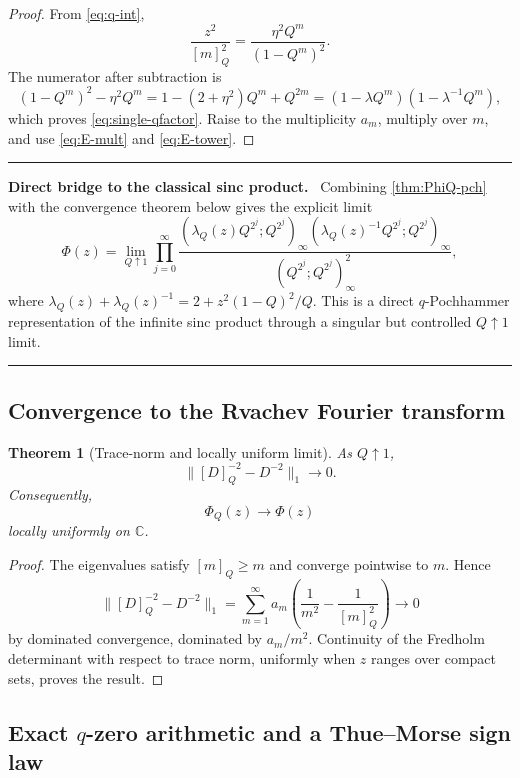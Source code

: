 \documentclass[11pt,oneside]{article}
\numberwithin{equation}{section}
\theoremstyle{plain}
\newtheorem{theorem}{Theorem}[section]
\theoremstyle{definition}
\theoremstyle{remark}
\newcommand{\C}{\mathbb C}
\newenvironment{resultbox}[1]{%
  \par\medskip\noindent\begin{minipage}{\textwidth}%
  \color{DeepGreen}\hrule\vspace{5pt}%
  \color{black}\textbf{\color{DeepGreen}#1.}\ }{%
  \par\vspace{5pt}\color{DeepGreen}\hrule
  \end{minipage}\par\medskip}
\begin{document}
\begin{proof}
From \cref{eq:q-int},
\[
 \frac{z^2}{[m]_Q^2}
 =\frac{\eta^2Q^m}{(1-Q^m)^2}.
\]
The numerator after subtraction is
\[
 (1-Q^m)^2-\eta^2Q^m
 =1-(2+\eta^2)Q^m+Q^{2m}
 =(1-\lambda Q^m)(1-\lambda^{-1}Q^m),
\]
which proves \cref{eq:single-qfactor}.  Raise to the multiplicity $a_m$, multiply over $m$, and use \cref{eq:E-mult} and \cref{eq:E-tower}.
\end{proof}

\begin{resultbox}{Direct bridge to the classical sinc product}
Combining \cref{thm:PhiQ-pch} with the convergence theorem below gives the explicit limit
\[
 \Phi(z)=\lim_{Q\uparrow1}
 \prod_{j=0}^{\infty}
 \frac{(\lambda_Q(z)Q^{2^j};Q^{2^j})_\infty
       (\lambda_Q(z)^{-1}Q^{2^j};Q^{2^j})_\infty}
      {(Q^{2^j};Q^{2^j})_\infty^2},
\]
where $\lambda_Q(z)+\lambda_Q(z)^{-1}=2+z^2(1-Q)^2/Q$.  This is a direct $q$-Pochhammer representation of the infinite sinc product through a singular but controlled $Q\uparrow1$ limit.
\end{resultbox}

\subsection{Convergence to the Rvachev Fourier transform}

\begin{theorem}[Trace-norm and locally uniform limit]\label{thm:PhiQ-limit}
As $Q\uparrow1$,
\begin{equation}\label{eq:trace-norm-limit}
 \bigl\|[D]_Q^{-2}-D^{-2}\bigr\|_1\longrightarrow0.
\end{equation}
Consequently,
\begin{equation}\label{eq:PhiQ-limit}
 \boxed{\ \Phi_Q(z)\longrightarrow\Phi(z)\ }
\end{equation}
locally uniformly on $\C$.
\end{theorem}

\begin{proof}
The eigenvalues satisfy $[m]_Q\ge m$ and converge pointwise to $m$.  Hence
\[
 \bigl\|[D]_Q^{-2}-D^{-2}\bigr\|_1
 =\sum_{m=1}^{\infty}a_m
 \left(\frac1{m^2}-\frac1{[m]_Q^2}\right)
 \longrightarrow0
\]
by dominated convergence, dominated by $a_m/m^2$.  Continuity of the Fredholm determinant with respect to trace norm, uniformly when $z$ ranges over compact sets, proves the result.
\end{proof}

\subsection{Exact $q$-zero arithmetic and a Thue--Morse sign law}
\end{document}
